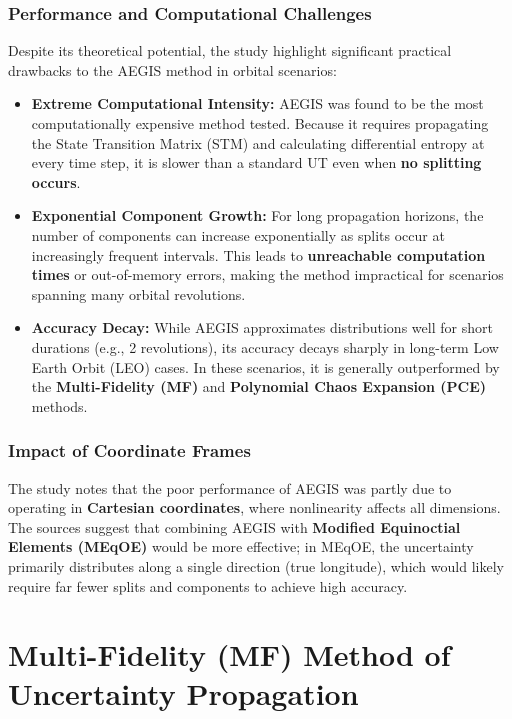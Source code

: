 \documentclass[
  letterpaper,
  DIV=11,
  numbers=noendperiod,
  oneside]{scrartcl}
\begin{document}
\subsubsection{Performance and Computational
Challenges}\label{performance-and-computational-challenges}

Despite its theoretical potential, the study highlight significant
practical drawbacks to the AEGIS method in orbital scenarios:

\begin{itemize}
\item
  \textbf{Extreme Computational Intensity:} AEGIS was found to be the
  most computationally expensive method tested. Because it requires
  propagating the State Transition Matrix (STM) and calculating
  differential entropy at every time step, it is slower than a standard
  UT even when \textbf{no splitting occurs}.
\item
  \textbf{Exponential Component Growth:} For long propagation horizons,
  the number of components can increase exponentially as splits occur at
  increasingly frequent intervals. This leads to \textbf{unreachable
  computation times} or out-of-memory errors, making the method
  impractical for scenarios spanning many orbital revolutions.
\item
  \textbf{Accuracy Decay:} While AEGIS approximates distributions well
  for short durations (e.g., 2 revolutions), its accuracy decays sharply
  in long-term Low Earth Orbit (LEO) cases. In these scenarios, it is
  generally outperformed by the \textbf{Multi-Fidelity (MF)} and
  \textbf{Polynomial Chaos Expansion (PCE)} methods.
\end{itemize}

\subsubsection{Impact of Coordinate
Frames}\label{impact-of-coordinate-frames}

The study notes that the poor performance of AEGIS was partly due to
operating in \textbf{Cartesian coordinates}, where nonlinearity affects
all dimensions. The sources suggest that combining AEGIS with
\textbf{Modified Equinoctial Elements (MEqOE)} would be more effective;
in MEqOE, the uncertainty primarily distributes along a single direction
(true longitude), which would likely require far fewer splits and
components to achieve high accuracy.

\section{Multi-Fidelity (MF) Method of Uncertainty
Propagation}\label{multi-fidelity-mf-method-of-uncertainty-propagation}
\end{document}
